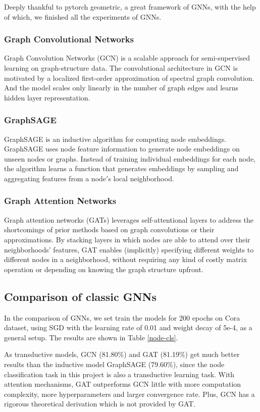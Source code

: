 \documentclass[fleqn,10pt]{SelfArx} %
\begin{document}
Deeply thankful to pytorch geometric, a great framework of GNNs, with the help of which, we finished all the experiments of GNNs. 

\subsubsection{Graph Convolutional Networks}
Graph Convolution Networks (GCN)\cite{chen2020simple} is a scalable approach for semi-supervised learning on graph-structure data. The convolutional architecture in GCN is motivated by a localized first-order approximation of spectral graph convolution. And the model scales only linearly  in the number of graph edges and learns hidden layer representation. 

\subsubsection{GraphSAGE}
GraphSAGE\cite{hamilton2017inductive} is an inductive algorithm for computing node embeddings. GraphSAGE uses node feature information to generate node embeddings on unseen nodes or graphs. Instead of training individual embeddings for each node, the algorithm learns a function that generates embeddings by sampling and aggregating features from a node$'$s local neighborhood.

\subsubsection{Graph Attention Networks}
Graph attention networks (GATs)\cite{velivckovic2017graph} leverages self-attentional 
layers to address the shortcomings of prior methods based on graph 
convolutions or their approximations. By stacking layers in which  nodes are able to attend over their neighborhoods’ features, GAT enables 
(implicitly) specifying different weights to different nodes in a 
neighborhood, without requiring any kind of costly matrix operation 
or depending on knowing the graph structure upfront. 

\subsection{Comparison of classic GNNs}
In the comparison of GNNs, we set train the models for 200 epochs on Cora dataset, using SGD with the learning rate of 0.01 and weight decay of 5e-4, as a general setup. The results are shown in Table \ref{node-cls}.

As transductive models, GCN (81.80\%) and GAT (81.19\%) get much better results than the inductive model GraphSAGE (79.60\%), since the node classification task in this project is also a transductive learning task. With attention mechanisms, GAT outperforms GCN little with more computation complexity, more hyperparameters and larger convergence rate. Plus, GCN has a rigorous theoretical derivation which is not provided by GAT.
\end{document}
